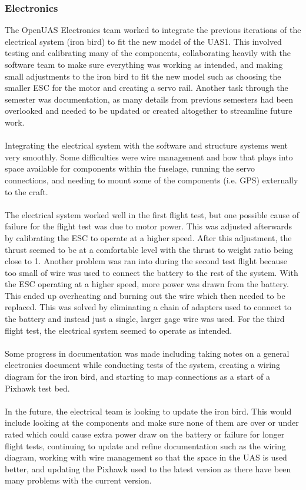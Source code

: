 \documentclass{article}
\begin{document}
\subsubsection{Electronics}
The OpenUAS Electronics team worked to integrate the previous iterations of the electrical system (iron bird) to fit the new model of the UAS1. This involved testing and calibrating many of the components, collaborating heavily with the software team to make sure everything was working as intended, and making small adjustments to the iron bird to fit the new model such as choosing the smaller ESC for the motor and creating a servo rail. Another task through the semester was documentation, as many details from previous semesters had been overlooked and needed to be updated or created altogether to streamline future work.\\\\
Integrating the electrical system with the software and structure systems went very smoothly. Some difficulties were wire management and how that plays into space available for components within the fuselage, running the servo connections, and needing to mount some of the components (i.e. GPS) externally to the craft.\\\\
The electrical system worked well in the first flight test, but one possible cause of failure for the flight test was due to motor power. This was adjusted afterwards by calibrating the ESC to operate at a higher speed. After this adjustment, the thrust seemed to be at a comfortable level with the thrust to weight ratio being close to 1. Another problem was ran into during the second test flight because too small of wire was used to connect the battery to the rest of the system. With the ESC operating at a higher speed, more power was drawn from the battery. This ended up overheating and burning out the wire which then needed to be replaced. This was solved by eliminating a chain of adapters used to connect to the battery and instead just a single, larger gage wire was used. For the third flight test, the electrical system seemed to operate as intended.\\\\
Some progress in documentation was made including taking notes on a general electronics document while conducting tests of the system, creating a wiring diagram for the iron bird, and starting to map connections as a start of a Pixhawk test bed.\\\\
In the future, the electrical team is looking to update the iron bird. This would include looking at the components and make sure none of them are over or under rated which could cause extra power draw on the battery or failure for longer flight tests, continuing to update and refine documentation such as the wiring diagram, working with wire management so that the space in the UAS is used better, and updating the Pixhawk used to the latest version as there have been many problems with the current version.
\end{document}
